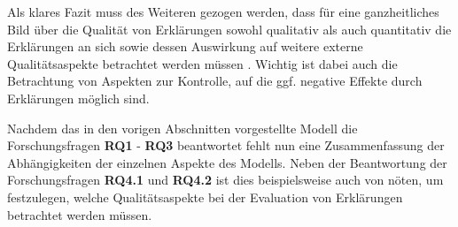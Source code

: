 Als klares Fazit muss des Weiteren gezogen werden, dass für eine ganzheitliches Bild über die Qualität von Erklärungen sowohl qualitativ als auch quantitativ die Erklärungen an sich sowie dessen Auswirkung auf weitere externe Qualitätsaspekte betrachtet werden müssen \cite{balog_measuring_2020}. Wichtig ist dabei auch die Betrachtung von Aspekten zur Kontrolle, auf die ggf. negative Effekte durch Erklärungen möglich sind.

\bigskip

Nachdem das in den vorigen Abschnitten vorgestellte Modell die Forschungsfragen \textbf{RQ1} - \textbf{RQ3} beantwortet fehlt nun eine Zusammenfassung der Abhängigkeiten der einzelnen Aspekte des Modells. Neben der Beantwortung der Forschungsfragen \textbf{RQ4.1} und \textbf{RQ4.2} ist dies beispielsweise auch von nöten, um festzulegen, welche Qualitätsaspekte bei der Evaluation von Erklärungen betrachtet werden müssen.